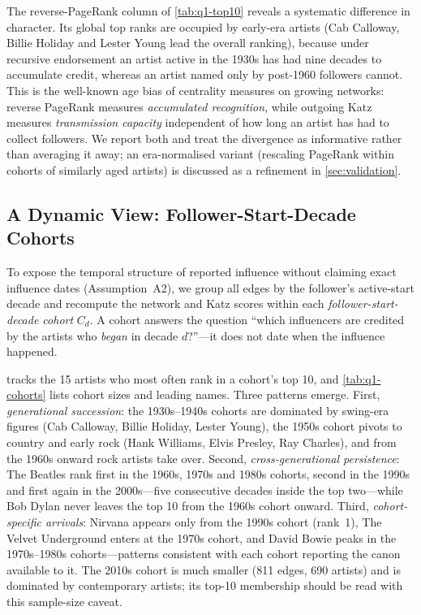 The reverse-PageRank column of \cref{tab:q1-top10} reveals a systematic
difference in character. Its global top ranks are occupied by early-era
artists (Cab Calloway, Billie Holiday and Lester Young lead the overall
ranking), because under recursive endorsement an artist active in the 1930s
has had nine decades to accumulate credit, whereas an artist named only by
post-1960 followers cannot. This is the well-known age bias of centrality
measures on growing networks: reverse PageRank measures \emph{accumulated
recognition}, while outgoing Katz measures \emph{transmission capacity}
independent of how long an artist has had to collect followers. We report
both and treat the divergence as informative rather than averaging it away;
an era-normalised variant (rescaling PageRank within cohorts of
similarly aged artists) is discussed as a refinement in
\cref{sec:validation}.

\subsection{A Dynamic View: Follower-Start-Decade Cohorts}\label{subsec:q1-cohorts}

To expose the temporal structure of reported influence without claiming exact
influence dates (Assumption~A2), we group all edges by the follower's
active-start decade and recompute the network and Katz scores within each
\emph{follower-start-decade cohort} \(C_d\). A cohort answers the question
``which influencers are credited by the artists who \emph{began} in decade
\(d\)?''---it does not date when the influence happened.

 tracks the 15 artists who most often rank in a cohort's
top 10, and \cref{tab:q1-cohorts} lists cohort sizes and leading names. Three
patterns emerge. First, \emph{generational succession}: the 1930s--1940s
cohorts are dominated by swing-era figures (Cab Calloway, Billie Holiday,
Lester Young), the 1950s cohort pivots to country and early rock (Hank
Williams, Elvis Presley, Ray Charles), and from the 1960s onward rock artists
take over. Second, \emph{cross-generational persistence}: The Beatles rank
first in the 1960s, 1970s and 1980s cohorts, second in the 1990s and first
again in the 2000s---five consecutive decades inside the top two---while Bob
Dylan never leaves the top 10 from the 1960s cohort onward. Third,
\emph{cohort-specific arrivals}: Nirvana appears only from the 1990s cohort
(rank~1), The Velvet Underground enters at the 1970s cohort, and David Bowie
peaks in the 1970s--1980s cohorts---patterns consistent with each cohort
reporting the canon available to it. The 2010s cohort is much smaller
(811 edges, 690 artists) and is dominated by contemporary artists; its
top-10 membership should be read with this sample-size caveat.

